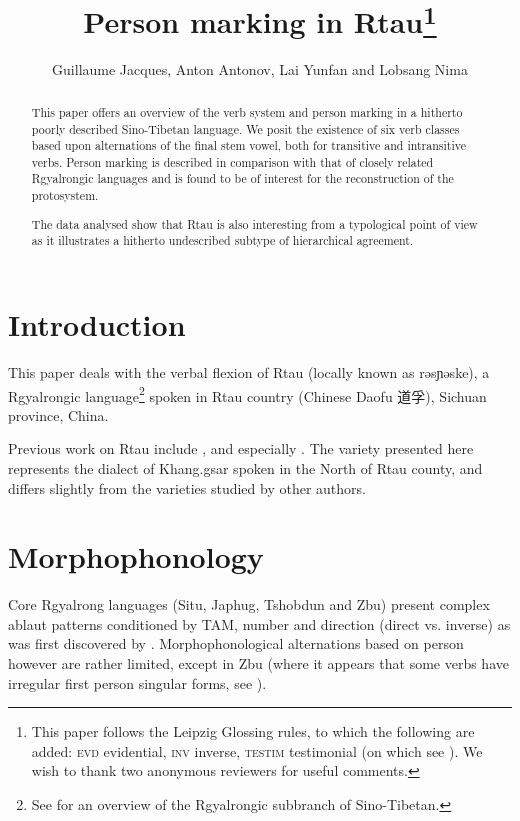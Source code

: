 \documentclass[oneside,a4paper,11pt]{article}
\newcommand{\ipa}[1]{{\phon #1}} %
\newcommand{\zh}[1]{{\cn #1}}
\begin{document}
 


\title{Person marking in Rtau\footnote{This paper follows the Leipzig Glossing rules, to which the following are added: \textsc{evd} evidential, \textsc{inv} inverse, \textsc{testim} testimonial (on which see \cite{hill13hdug}). We wish to thank two anonymous reviewers for useful comments.} }
\author{Guillaume Jacques, Anton Antonov, Lai Yunfan and Lobsang Nima}

\maketitle

\begin{abstract}
 This paper offers an overview of the verb system and person marking in a hitherto poorly described Sino-Tibetan language. We posit the existence of six verb classes based upon alternations of the final stem vowel, both for transitive and intransitive verbs. Person marking is described in comparison with that of closely related Rgyalrongic languages and is found to be of interest for the reconstruction of the protosystem. 

The data analysed show that Rtau is also interesting from a typological point of view as it illustrates a hitherto undescribed subtype of hierarchical agreement.
\end{abstract}

\section{Introduction}


This paper deals with the verbal flexion of   Rtau (locally known as \ipa{rəsɲəske}), a Rgyalrongic language\footnote{See \citet{jackson00sidaba} for an overview of the Rgyalrongic subbranch of Sino-Tibetan.} spoken in Rtau country (Chinese Daofu \zh{道孚}), Sichuan province, China.

Previous work on Rtau include \citet{huangbf91daofu}, \citet{jackson07shangzhai} and especially \citet{sun13gexi}. The variety presented here represents the dialect of Khang.gsar spoken in the North of Rtau county, and differs slightly from the varieties studied by other authors.
 
\section{Morphophonology}
Core Rgyalrong languages (Situ, Japhug, Tshobdun and Zbu) present complex ablaut patterns conditioned by TAM, number and direction (direct vs. inverse) as was first discovered by  \citet{jackson00sidaba}.  Morphophonological alternations based on person however are rather limited, except in Zbu (where it appears that some verbs have irregular first person singular forms, see \citealt{gongxun14agreement}).
\end{document}
